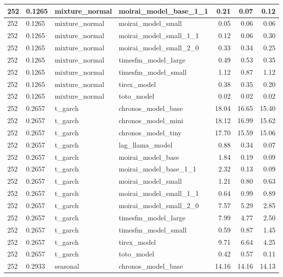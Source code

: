 {\begin{tabular}{llllrrr}
\midrule
252 & 0.1265 & mixture\_normal & moirai\_model\_base\_1\_1 & 0.21 & 0.07 & 0.12 \\
\midrule
252 & 0.1265 & mixture\_normal & moirai\_model\_small & 0.05 & 0.06 & 0.06 \\
\midrule
252 & 0.1265 & mixture\_normal & moirai\_model\_small\_1\_1 & 0.12 & 0.06 & 0.30 \\
\midrule
252 & 0.1265 & mixture\_normal & moirai\_model\_small\_2\_0 & 0.33 & 0.34 & 0.25 \\
\midrule
252 & 0.1265 & mixture\_normal & timesfm\_model\_large & 0.49 & 0.53 & 0.35 \\
\midrule
252 & 0.1265 & mixture\_normal & timesfm\_model\_small & 1.12 & 0.87 & 1.12 \\
\midrule
252 & 0.1265 & mixture\_normal & tirex\_model & 0.38 & 0.35 & 0.20 \\
\midrule
252 & 0.1265 & mixture\_normal & toto\_model & 0.02 & 0.02 & 0.02 \\
\midrule
252 & 0.2657 & t\_garch & chronos\_model\_base & 18.04 & 16.65 & 15.40 \\
\midrule
252 & 0.2657 & t\_garch & chronos\_model\_mini & 18.12 & 16.99 & 15.62 \\
\midrule
252 & 0.2657 & t\_garch & chronos\_model\_tiny & 17.70 & 15.59 & 15.06 \\
\midrule
252 & 0.2657 & t\_garch & lag\_llama\_model & 0.88 & 0.34 & 0.07 \\
\midrule
252 & 0.2657 & t\_garch & moirai\_model\_base & 1.84 & 0.19 & 0.09 \\
\midrule
252 & 0.2657 & t\_garch & moirai\_model\_base\_1\_1 & 2.32 & 0.13 & 0.09 \\
\midrule
252 & 0.2657 & t\_garch & moirai\_model\_small & 1.21 & 0.80 & 0.63 \\
\midrule
252 & 0.2657 & t\_garch & moirai\_model\_small\_1\_1 & 0.64 & 0.99 & 0.89 \\
\midrule
252 & 0.2657 & t\_garch & moirai\_model\_small\_2\_0 & 7.57 & 5.29 & 2.85 \\
\midrule
252 & 0.2657 & t\_garch & timesfm\_model\_large & 7.99 & 4.77 & 2.50 \\
\midrule
252 & 0.2657 & t\_garch & timesfm\_model\_small & 0.59 & 0.87 & 1.45 \\
\midrule
252 & 0.2657 & t\_garch & tirex\_model & 9.71 & 6.64 & 4.25 \\
\midrule
252 & 0.2657 & t\_garch & toto\_model & 0.42 & 0.57 & 0.11 \\
\midrule
252 & 0.2933 & seasonal & chronos\_model\_base & 14.16 & 14.16 & 14.13 \\

\end{tabular}}

